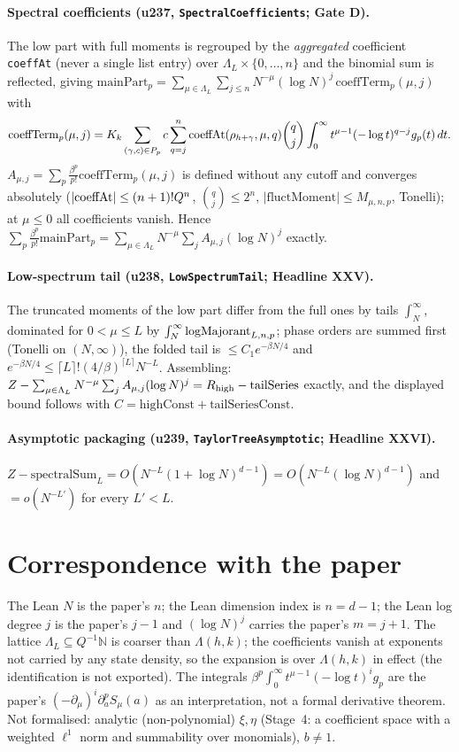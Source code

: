 \documentclass[11pt]{article}
\begin{document}
\paragraph{Spectral coefficients (u237, \texttt{SpectralCoefficients}; Gate D).} The low part with full
moments is regrouped by the \emph{aggregated} coefficient \texttt{coeffAt} (never a single list entry)
over $\Lambda_L\times\{0,\dots,n\}$ and the binomial sum is reflected, giving
$\text{mainPart}_p=\sum_{\mu\in\Lambda_L}\sum_{j\le n}N^{-\mu}(\log N)^j\,\text{coeffTerm}_p(\mu,j)$ with
\[
\text{coeffTerm}_p(\mu,j)=K_k\sum_{(\gamma,c)\in P_p}c\sum_{q=j}^{n}{\rm coeffAt}(\rho_{h+\gamma},\mu,q)\binom qj
\int_0^\infty t^{\mu-1}(-\log t)^{q-j}g_p(t)\,dt .
\]
$A_{\mu,j}=\sum_p\frac{\beta^p}{p!}\text{coeffTerm}_p(\mu,j)$ is defined without any cutoff and converges
absolutely ($|{\rm coeffAt}|\le(n+1)!Q^n$, $\binom qj\le2^n$, $|\text{fluctMoment}|\le M_{\mu,n,p}$, Tonelli);
at $\mu\le0$ all coefficients vanish. Hence $\sum_p\frac{\beta^p}{p!}\text{mainPart}_p=\sum_{\mu\in\Lambda_L}
N^{-\mu}\sum_jA_{\mu,j}(\log N)^j$ exactly.

\paragraph{Low-spectrum tail (u238, \texttt{LowSpectrumTail}; Headline XXV).} The truncated moments of the
low part differ from the full ones by tails $\int_N^\infty$, dominated for $0<\mu\le L$ by
$\int_N^\infty{\rm logMajorant}_{L,n,p}$; phase orders are summed first (Tonelli on $(N,\infty)$), the
folded tail is $\le C_1e^{-\beta N/4}$ and $e^{-\beta N/4}\le\lceil L\rceil!(4/\beta)^{\lceil L\rceil}N^{-L}$.
Assembling: $Z-\sum_{\mu\in\Lambda_L}N^{-\mu}\sum_jA_{\mu,j}(\log N)^j=R_{\rm high}-\text{tailSeries}$ exactly,
and the displayed bound follows with $C=\text{highConst}+\text{tailSeriesConst}$.

\paragraph{Asymptotic packaging (u239, \texttt{TaylorTreeAsymptotic}; Headline XXVI).}
$Z-\text{spectralSum}_L=O(N^{-L}(1+\log N)^{d-1})=O(N^{-L}(\log N)^{d-1})$ and $=o(N^{-L'})$ for every $L'<L$.

\section{Correspondence with the paper}
The Lean $N$ is the paper's $n$; the Lean dimension index is $n=d-1$; the Lean log degree $j$ is the
paper's $j-1$ and $(\log N)^j$ carries the paper's $m=j+1$. The lattice $\Lambda_L\subseteq Q^{-1}\mathbb N$ is
coarser than $\Lambda(h,k)$; the coefficients vanish at exponents not carried by any state density, so the
expansion is over $\Lambda(h,k)$ in effect (the identification is not exported). The integrals
$\beta^p\int_0^\infty t^{\mu-1}(-\log t)^ig_p$ are the paper's $(-\partial_\mu)^i\partial_a^pS_\mu(a)$ as an
interpretation, not a formal derivative theorem. Not formalised: analytic (non-polynomial) $\xi,\eta$
(Stage~4: a coefficient space with a weighted $\ell^1$ norm and summability over monomials), $b\ne1$.
\end{document}
